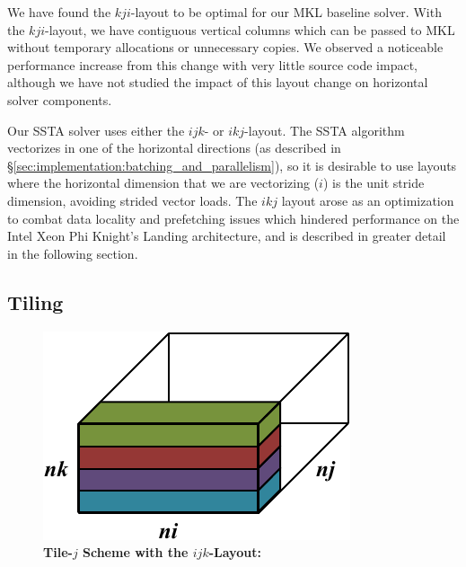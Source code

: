 \documentclass{sig-alternate-05-2015}
\begin{document}
We have found the \(kji\)-layout to be optimal for our MKL baseline solver.
With the \(kji\)-layout, we have contiguous vertical columns which can be
  passed to MKL without temporary allocations or unnecessary copies.
We observed a noticeable performance increase from this change with very
  little source code impact, although we have not studied the impact of this
  layout change on horizontal solver components.


Our SSTA solver uses either the \(ijk\)- or \(ikj\)-layout.
The SSTA algorithm vectorizes in one of the horizontal directions (as described
  in \S\ref{sec:implementation:batching_and_parallelism}), so it is desirable to
  use layouts where the horizontal dimension that we are vectorizing (\(i\)) is
  the unit stride dimension, avoiding strided vector loads.
The \(ikj\) layout arose as an optimization to combat data locality and prefetching
  issues which hindered performance on the Intel Xeon Phi Knight's Landing
  architecture, and is described in greater detail in the following section.

\subsection{Tiling}
\label{sec:implementation:tiling}

\begin{figure}[!bt]
  \centering
  \label{fig:implementation:tiling:ijk_layout_tile_j}
  \caption{
    \textbf{Tile-\(j\) Scheme with the \(ijk\)-Layout:} 
  }
  \includegraphics[width=0.95\columnwidth]{figures/ijk_layout_tile_j_scheme.pdf}
\end{figure}
\end{document}
